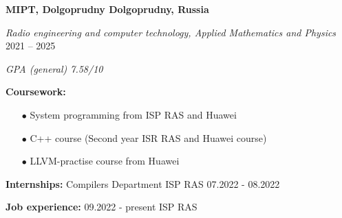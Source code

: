 \textbf{MIPT, Dolgoprudny \hfill Dolgoprudny, Russia} \par
\textit{Radio engineering and computer technology, Applied Mathematics and Physics} \hfill 2021 -- 2025\par
\textit{GPA (general) 7.58/10} \par
\textbf{Coursework:}
\begin{enumerate}
    \item[$\bullet$] System programming from ISP RAS and Huawei
    \item[$\bullet$] C++ course (Second year ISR RAS and Huawei course)
    \item[$\bullet$] LLVM-practise course from Huawei
\end{enumerate}
\textbf{Internships:} Compilers Department ISP RAS 07.2022 - 08.2022 \par
\textbf{Job experience:} 09.2022 - present ISP RAS